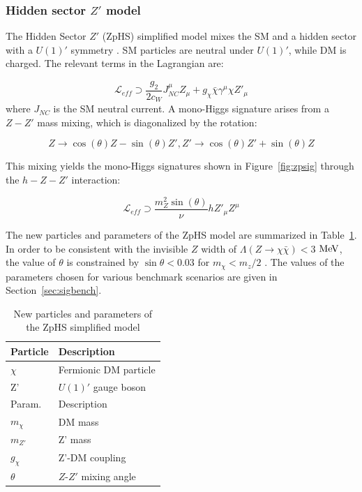 \subsubsection{Hidden sector $Z'$ model}

The Hidden Sector $Z'$ (ZpHS) simplified model mixes the SM and a hidden sector with a $U(1)'$ symmetry \cite{Chang:2006fp, Pospelov:2007mp, Feldman:2007wj, Feng:2008mu, Gopalakrishna:2008dv}. SM particles are neutral under $U(1)'$, while DM is charged. The relevant terms in the Lagrangian are:

\begin{equation}
\mathcal{L}_{eff} \supset \frac{g_2}{2c_W} J^\mu_{NC} Z_\mu + g_\chi \bar{\chi} \gamma^\mu \chi Z'_\mu
\end{equation}
where $J_{NC}$ is the SM neutral current. A mono-Higgs signature arises from a $Z-Z'$ mass mixing, which is diagonalized by the rotation:

\begin{equation}
Z \rightarrow \cos(\theta) Z - \sin(\theta) Z', Z' \rightarrow \cos(\theta) Z' + \sin(\theta) Z
\end{equation}

This mixing yields the mono-Higgs signatures shown in Figure~\ref{fig:zpsig} through the $h-Z-Z'$ interaction: 

\begin{equation}
\mathcal{L}_{eff} \supset \frac{m_Z^2 \sin(\theta)}{\nu} h Z'_\mu Z^\mu
\end{equation}

The new particles and parameters of the ZpHS model are summarized in Table~\ref{tab:ZpHS}. In order to be consistent with the invisible $Z$ width of $\Lambda(Z\rightarrow \chi\bar{\chi})<3$ $\mathrm{Me\kern -0.1em V}$, the value of $\theta$ is constrained by $\sin\theta<0.03$ for $m_\chi < m_z/2$ \cite{PhysRevD.86.010001}. The values of the parameters chosen for various benchmark scenarios are given in Section~\ref{sec:sigbench}.

\begin{table}[htbH]
\begin{center}
\begin{tabular}{ l | l}
\hline
Particle & Description \\
\hline
$\chi$ & Fermionic DM particle \\
Z' & $U(1)'$ gauge boson \\
\hline
Param. & Description \\
\hline
$m_\chi$ & DM mass \\
$m_{Z'}$ & Z' mass \\
$g_\chi$ & Z'-DM coupling \\
$\theta$ & $Z$-$Z'$ mixing angle \\
\hline
\end{tabular}
\caption{New particles and parameters of the ZpHS simplified model \cite{Carpenter:2013xra}}\label{tab:ZpHS}
\end{center}
\end{table}

